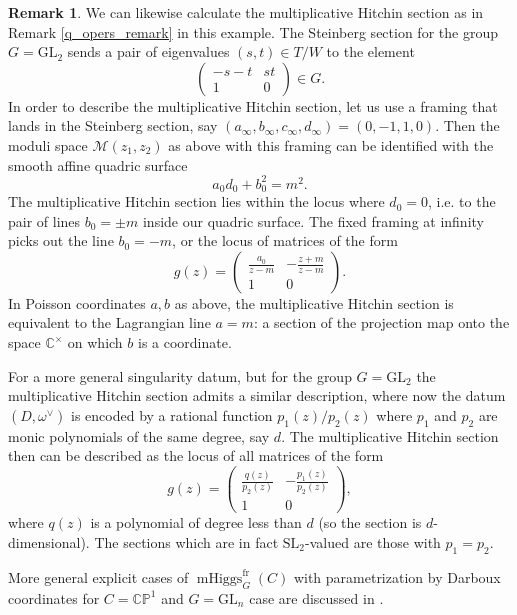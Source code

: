 \documentclass[11pt, oneside, reqno]{amsart}
\theoremstyle{definition} \newtheorem{definition}{Definition}[section]
\theoremstyle{definition} \newtheorem{remark}[definition]{Remark}
\theoremstyle{definition} \newtheorem{remarks}[definition]{Remarks}
\theoremstyle{definition} \newtheorem{question}[definition]{Question}
\theoremstyle{definition} \newtheorem*{note}{Note}
\theoremstyle{definition} \newtheorem{example}[definition]{Example}
\theoremstyle{definition} \newtheorem{examples}[definition]{Examples}
\newcommand{\bb}[1]{\mathbb{#1}}
\newcommand{\mc}[1]{\mathcal{#1}}
\newcommand{\CC}{\mathbb{C}}
\newcommand{\SL}{\mathrm{SL}}
\newcommand{\GL}{\mathrm{GL}}
\DeclareMathOperator{\mhiggs}{mHiggs}
\newcommand{\fr}{\mathrm{fr}}
\begin{document}
\begin{remark}
We can likewise calculate the multiplicative Hitchin section as in Remark \ref{q_opers_remark} in this example.  The Steinberg section for the group $G = \GL_2$ sends a pair of eigenvalues $(s,t) \in T/W$ to the element
\[\begin{pmatrix}-s-t & st \\ 1 & 0\end{pmatrix} \in G.\]
In order to describe the multiplicative Hitchin section, let us use a framing that lands in the Steinberg section, say $(a_\infty, b_\infty,c_\infty, d_\infty) = (0,-1,1,0)$.  Then the moduli space $\mc M(z_1,z_2)$ as above with this framing can be identified with the smooth affine quadric surface 
    \begin{equation*}
        a_0d_0 + b_0^2  = m^2 .
    \end{equation*}
The multiplicative Hitchin section lies within the locus where $d_0=0$, i.e. to the pair of lines $b_0 = \pm m$ inside our quadric surface.  The fixed framing at infinity picks out the line $b_0 = - m$, or the locus of matrices of the form 
\[g(z) = \begin{pmatrix} \frac{a_0}{z-m} & - \frac{z+m}{z-m} \\ 1 & 0\end{pmatrix}.\]
In Poisson coordinates $a,b$ as above, the multiplicative Hitchin section is equivalent to the Lagrangian line $a = m$: a section of the projection map onto the space $\CC^\times$ on which $b$ is a coordinate.    

For a more general singularity datum, but for the group $G=\GL_2$ the multiplicative Hitchin section admits a similar description, where now the datum $(D,\omega^\vee)$ is encoded by a rational function $p_1(z)/p_2(z)$ where $p_1$ and $p_2$ are monic polynomials of the same degree, say $d$.  The multiplicative Hitchin section then can be described as the locus of all matrices of the form
\[g(z) = \begin{pmatrix} \frac{q(z)}{p_2(z)} & - \frac{p_1(z)}{p_2(z)} \\ 1 & 0\end{pmatrix},\]
where $q(z)$ is a polynomial of degree less than $d$ (so the section is $d$-dimensional).  The sections which are in fact $\SL_2$-valued are those with $p_1 = p_2$.
\end{remark}

More general explicit cases of $\mhiggs^\fr_G(C)$ with parametrization by Darboux coordinates for $C = \bb{CP}^1$ and $G=\GL_n$ case are discussed in \cite{FrassekPestun}.
\end{document}
